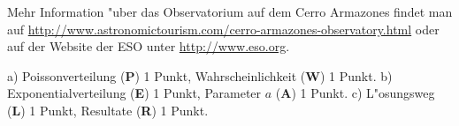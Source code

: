 \begin{diskussion}
Mehr Information "uber das Observatorium auf dem Cerro Armazones
findet man auf \url{http://www.astronomictourism.com/cerro-armazones-observatory.html} oder auf der Website der ESO unter \url{http://www.eso.org}.
\end{diskussion}

\begin{bewertung}
a) Poissonverteilung ({\bf P}) 1 Punkt, Wahrscheinlichkeit ({\bf W}) 1 Punkt.
b) Exponentialverteilung ({\bf E}) 1 Punkt, Parameter $a$ ({\bf A}) 1 Punkt.
c) L"osungsweg ({\bf L}) 1 Punkt, Resultate ({\bf R}) 1 Punkt.
\end{bewertung}
